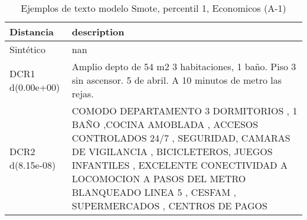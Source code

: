 \begin{table}[H]
\centering
\fontsize{10}{14}\selectfont
\caption{Ejemplos de texto modelo Smote, percentil 1, Economicos (A-1)}
\label{table-example-economicos-a-1-smote-enc-1p-text}
\begin{tabular}{|l|m{35em}|}
\hline
\rowcolor[gray]{0.8}
Distancia & description \\
\hline Sintético & nan \\
\hline DCR1 d(0.00e+00) & Amplio depto de 54 m2 3 habitaciones, 1 ba\~no. Piso 3 sin ascensor.   5 de abril. A 10 minutos de metro las rejas. \\
\hline DCR2 d(8.15e-08) & COMODO DEPARTAMENTO 3 DORMITORIOS , 1 BA\~NO ,COCINA AMOBLADA , ACCESOS CONTROLADOS 24/7 , SEGURIDAD, CAMARAS DE VIGILANCIA , BICICLETEROS, JUEGOS INFANTILES , EXCELENTE CONECTIVIDAD A LOCOMOCION A PASOS DEL METRO BLANQUEADO LINEA 5 , CESFAM , SUPERMERCADOS , CENTROS DE PAGOS \\
\hline
\end{tabular}
\end{table}
